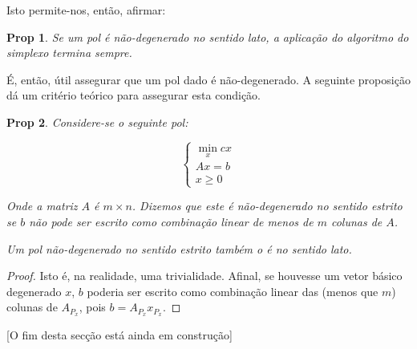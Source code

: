 \documentclass{article}
\newtheorem{prop}{Prop}
\theoremstyle{definition}
\begin{document}
	Isto permite-nos, então, afirmar:
	
	\begin{prop}
	Se um pol é não-degenerado no sentido lato, a aplicação do algoritmo do simplexo termina sempre.
	\end{prop}
	
	É, então, útil assegurar que um pol dado é não-degenerado. A seguinte proposição dá um critério teórico para assegurar esta condição.
	
	\begin{prop}
	Considere-se o seguinte pol:
	
	\[
	\begin{cases}
	\min\limits_x cx\\
	Ax = b\\
	x \geq 0
	\end{cases}
	\]
	
	Onde a matriz $A$ é $m \times n$. Dizemos que este é \emph{não-degenerado no sentido estrito} se $b$ não pode ser escrito como combinação linear de menos de $m$ colunas de $A$.
	
	Um pol não-degenerado no sentido estrito também o é no sentido lato.
	\end{prop}
	
	\begin{proof}
	Isto é, na realidade, uma trivialidade. Afinal, se houvesse um vetor básico degenerado $x$, $b$ poderia ser escrito como combinação linear das (menos que $m$) colunas de $A_{P_x}$, pois $b = A_{P_x} x_{P_x}$.
	\end{proof}
	
	[O fim desta secção está ainda em construção]
	
	
\end{document}
